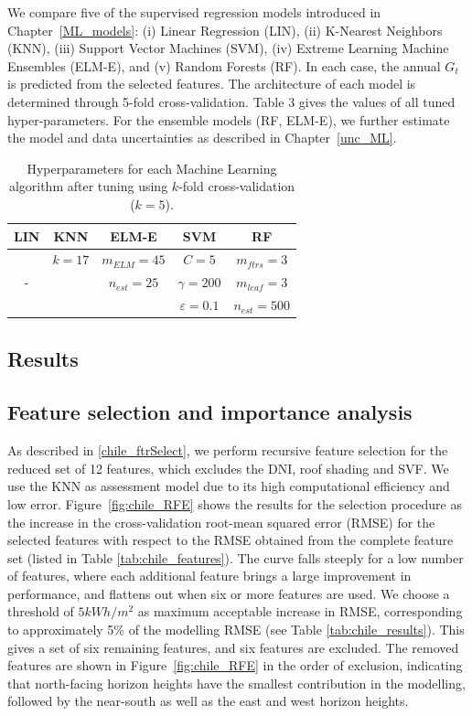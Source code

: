 We compare five of the supervised regression models introduced in Chapter~\ref{ML_models}: (i) Linear Regression (LIN), (ii) K-Nearest Neighbors (KNN), (iii) Support Vector Machines (SVM), (iv) Extreme Learning Machine Ensembles (ELM-E), and (v) Random Forests (RF). In each case, the annual $G_t$ is predicted from the selected features. The architecture of each model is determined through 5-fold cross-validation. Table 3 gives the values of all tuned hyper-parameters. 
For the ensemble models (RF, ELM-E), we further estimate the model and data uncertainties as described in Chapter~\ref{unc_ML}.

\begin{table}[tb]
\centering
\footnotesize
\caption{Hyperparameters for each Machine Learning algorithm after tuning using $k$-fold cross-validation ($k = 5$).}
\label{tab:chile_hyperparams}
\begin{tabular}{ccccc}
\hline
\textbf{LIN}       & \textbf{KNN}      & \textbf{ELM-E}     & \textbf{SVM}     & \textbf{RF}         \\\hline
\multirow{3}{*}{-} & $k = 17$   & $m_{ELM} = 45$ & $C = 5 $  & $m_{ftrs} = 3$  \\
                   & \multirow{2}{*}{} & $n_{est} = 25$ &  $\gamma = 200$ & $m_{leaf} = 3$  \\
                   &                   &                    & $\varepsilon = 0.1$ & $n_{est} = 500$\\
\hline
\end{tabular}
\end{table}

\subsection{Results}

\subsection{Feature selection and importance analysis}

As described in \ref{chile_ftrSelect}, we perform recursive feature selection for the reduced set of 12 features, which excludes the DNI, roof shading and SVF. We use the KNN as assessment model due to its high computational efficiency and low error. Figure~\ref{fig:chile_RFE} shows the results for the selection procedure as the increase in the cross-validation root-mean squared error (RMSE) for the selected features with respect to the RMSE obtained from the complete feature set (listed in Table \ref{tab:chile_features}). The curve falls steeply for a low number of features, where each additional feature brings a large improvement in performance, and flattens out when six or more features are used. We choose a threshold of $5 kWh/m^2$ as maximum acceptable increase in RMSE, corresponding to approximately 5\% of the modelling RMSE (see Table \ref{tab:chile_results}). This gives a set of six remaining features, and six features are excluded. The removed features are shown in Figure~\ref{fig:chile_RFE} in the order of exclusion, indicating that north-facing horizon heights have the smallest contribution in the modelling, followed by the near-south as well as the east and west horizon heights.

